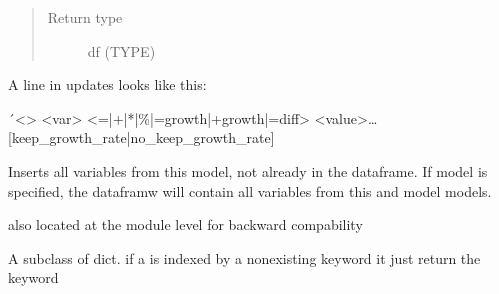 \documentclass[letterpaper,10pt,english]{sphinxmanual}
\begin{document}
\begin{fulllineitems}
\begin{fulllineitems}
\begin{quote}
\begin{description}
\item[{Return type}] \leavevmode
\sphinxAtStartPar
df (TYPE)

\end{description}\end{quote}

\sphinxAtStartPar
A line in updates looks like this:

\sphinxAtStartPar
´\textless{}\sphinxtitleref{{[}{[}start{]} end{]}}\textgreater{}\textasciigrave{} \textless{}var\textgreater{} \textless{}=|+|*|\%|=growth|+growth|=diff\textgreater{} \textless{}value\textgreater{}… {[}\textendash{}keep\_growth\_rate|\textendash{}no\_keep\_growth\_rate{]}

\end{fulllineitems}


\begin{fulllineitems}
\label{\detokenize{index:modelclass.Model_help_Mixin.insertModelVar}}
\pysigstartsignatures
{}
\pysigstopsignatures
\sphinxAtStartPar
Inserts all variables from this model, not already in the dataframe.
If model is specified, the dataframw will contain all variables from this and model models.

\sphinxAtStartPar
also located at the module level for backward compability

\end{fulllineitems}


\begin{fulllineitems}
\label{\detokenize{index:modelclass.Model_help_Mixin.defsub}}
\pysigstartsignatures
{}
\pysigstopsignatures
\sphinxAtStartPar
A subclass of dict.
if a  is indexed by a nonexisting keyword it just return the keyword

\end{fulllineitems}



\end{fulllineitems}
\end{document}
